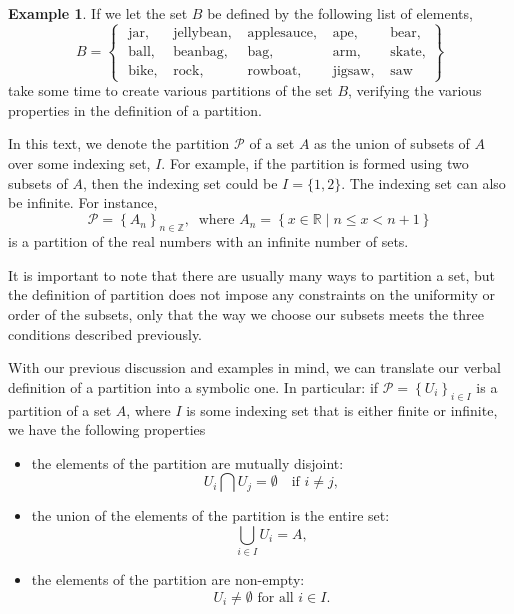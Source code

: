 \documentclass[
]{book}
\theoremstyle{definition}
\theoremstyle{definition}
\newtheorem{example}{Example}[chapter]
\theoremstyle{definition}
\theoremstyle{definition}
\theoremstyle{remark}
\begin{document}
\begin{example}
If we let the set \(B\) be defined by the following list of elements,
\[B = \begin{Bmatrix} 
\mbox{ jar},  & \mbox{ jellybean} ,  & \mbox{ applesauce}, & \mbox{ ape}, & \mbox{ bear}, \\
\mbox{ ball}, & \mbox{ beanbag}, & \mbox{ bag}, & \mbox{ arm} , & \mbox{ skate} , \\
\mbox{ bike}, & \mbox{ rock}, & \mbox{ rowboat},   &  \mbox{ jigsaw}, & \mbox{ saw}
 \end{Bmatrix}\]
take some time to create various partitions of the set \(B\), verifying the various properties in the definition of a partition.
\end{example}

In this text, we denote the partition \(\mathcal{P}\) of a set \(A\) as the union of subsets of \(A\) over some indexing set, \(I\). For example, if the partition is formed using two subsets of \(A\), then the indexing set could be \(I=\{1,2\}\). The indexing set can also be infinite. For instance,
\[\mathcal{P} = \left\{ A_n  \right\}_{n\in \mathbb{Z}}, \: \mbox{ where } A_n=\left\{x\in \mathbb{R}\middle \vert n\leq x < n+1  \right\}\] is a partition of the real numbers with an infinite number of sets.

It is important to note that there are usually many ways to partition a set, but the definition of partition does not impose any constraints on the uniformity or order of the subsets, only that the way we choose our subsets meets the three conditions described previously.

With our previous discussion and examples in mind, we can translate our verbal definition of a partition into a symbolic one. In particular: if \(\mathcal{P}= \left\{ U_i\right\}_{i\in I}\) is a partition of a set \(A\), where \(I\) is some indexing set that is either finite or infinite, we have the following properties

\begin{itemize}
\item
  the elements of the partition are mutually disjoint: \[U_i \bigcap U_j = \emptyset \quad \mbox{if } i\neq j,\]
\item
  the union of the elements of the partition is the entire set: \[\bigcup_{i\in I} U_i = A,\]
\item
  the elements of the partition are non-empty: \[U_i \neq \emptyset \mbox{ for all } i \in I.\]
\end{itemize}
\end{document}
